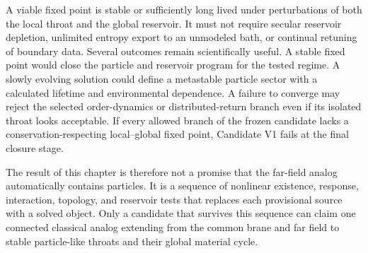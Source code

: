 A viable fixed point is stable or sufficiently long lived under perturbations of
both the local throat and the global reservoir. It must not require secular
reservoir depletion, unlimited entropy export to an unmodeled bath, or continual
retuning of boundary data. Several outcomes remain scientifically useful. A
stable fixed point would close the particle and reservoir program for the tested
regime. A slowly evolving solution could define a metastable particle sector
with a calculated lifetime and environmental dependence. A failure to converge
may reject the selected order-dynamics or distributed-return branch even if its
isolated throat looks acceptable. If every allowed branch of the frozen candidate lacks
a conservation-respecting local--global fixed point, Candidate V1 fails at the
final closure stage.

The result of this chapter is therefore not a promise that the far-field analog
automatically contains particles. It is a sequence of nonlinear existence,
response, interaction, topology, and reservoir tests that replaces each
provisional source with a solved object. Only a candidate that survives this
sequence can claim one connected classical analog extending from the common
brane and far field to stable particle-like throats and their global material
cycle.
